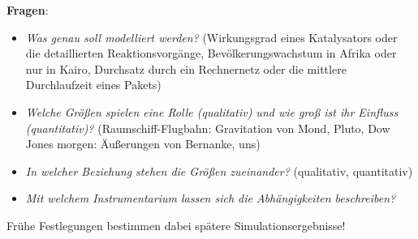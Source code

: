 \textbf{Fragen}:
\begin{itemize}
    \item
    \emph{Was genau soll modelliert werden?}
    (Wirkungsgrad eines Katalysators oder die detaillierten Reaktionsvorgänge,
    Bevölkerungswachstum in Afrika oder nur in Kairo,
    Durchsatz durch ein Rechnernetz oder die mittlere Durchlaufzeit eines Pakets)

    \item
    \emph{Welche Größen spielen eine Rolle (qualitativ)
    und wie groß ist ihr Einfluss (quantitativ)?}
    (Raumschiff-Flugbahn: Gravitation von Mond, Pluto,
    Dow Jones morgen: Äußerungen von Bernanke, uns)

    \item
    \emph{In welcher Beziehung stehen die Größen zueinander?}
    (qualitativ, quantitativ)

    \item
    \emph{Mit welchem Instrumentarium lassen sich die Abhängigkeiten beschreiben?}
\end{itemize}
Frühe Festlegungen bestimmen dabei spätere Simulationsergebnisse!

\linie

